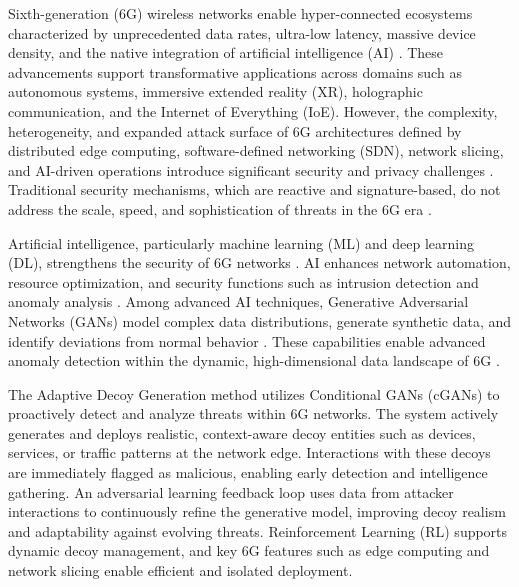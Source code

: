 \documentclass{article}
\begin{document}
Sixth-generation (6G) wireless networks enable hyper-connected ecosystems characterized by unprecedented data rates, ultra-low latency, massive device density, and the native integration of artificial intelligence (AI) \cite{Imoize20216GESX, Li2025EvolvingTAL}. These advancements support transformative applications across domains such as autonomous systems, immersive extended reality (XR), holographic communication, and the Internet of Everything (IoE). However, the complexity, heterogeneity, and expanded attack surface of 6G architectures defined by distributed edge computing, software-defined networking (SDN), network slicing, and AI-driven operations introduce significant security and privacy challenges \cite{Nguyen2021SecurityAPN, Hussein2022SecurityRAAA, Li2024TheSAR, Abuadbba2024From5TAM, Salas2024SecurityTAAN, Janay2023SecureDTAO}. Traditional security mechanisms, which are reactive and signature-based, do not address the scale, speed, and sophistication of threats in the 6G era \cite{Rahman2021NetworkAPAQ, Siriwardhana2021AIA6W}.

Artificial intelligence, particularly machine learning (ML) and deep learning (DL), strengthens the security of 6G networks \cite{Haider2020ArtificialIAT, Siriwardhana2021AIA6W, Li2025EvolvingTAL}. AI enhances network automation, resource optimization, and security functions such as intrusion detection and anomaly analysis \cite{Cifuentes2024AnalysisOTE, Gkonis2024LeveragingNDAF, Rodrguez2024ASSQ}. Among advanced AI techniques, Generative Adversarial Networks (GANs) model complex data distributions, generate synthetic data, and identify deviations from normal behavior \cite{Vu2024ApplicationsOGC, Ayanoglu2022MachineLIA}. These capabilities enable advanced anomaly detection within the dynamic, high-dimensional data landscape of 6G \cite{Ferrag2023GenerativeAFB, Arifin2024ASOF}.

The Adaptive Decoy Generation method utilizes Conditional GANs (cGANs) to proactively detect and analyze threats within 6G networks. The system actively generates and deploys realistic, context-aware decoy entities such as devices, services, or traffic patterns at the network edge. Interactions with these decoys are immediately flagged as malicious, enabling early detection and intelligence gathering. An adversarial learning feedback loop uses data from attacker interactions to continuously refine the generative model, improving decoy realism and adaptability against evolving threats. Reinforcement Learning (RL) supports dynamic decoy management, and key 6G features such as edge computing and network slicing enable efficient and isolated deployment.
\end{document}
